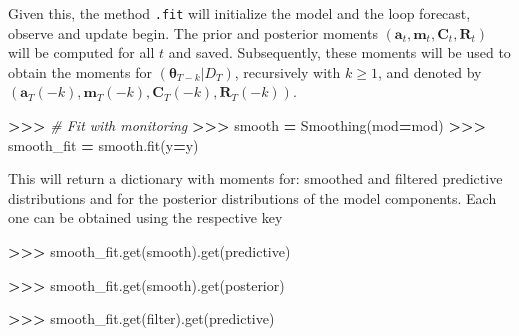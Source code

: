 \documentclass[
]{article}
\newenvironment{Shaded}{\begin{snugshade}}{\end{snugshade}}
\newcommand{\CommentTok}[1]{\textcolor[rgb]{0.56,0.35,0.01}{\textit{#1}}}
\newcommand{\NormalTok}[1]{#1}
\newcommand{\OperatorTok}[1]{\textcolor[rgb]{0.81,0.36,0.00}{\textbf{#1}}}
\newcommand{\StringTok}[1]{\textcolor[rgb]{0.31,0.60,0.02}{#1}}
\begin{document}
Given this, the method \texttt{.fit} will initialize the model and the
loop forecast, observe and update begin. The prior and posterior moments
\((\mathbf{a}_t, \mathbf{m}_t, \mathbf{C}_t, \mathbf{R}_t)\) will be
computed for all \(t\) and saved. Subsequently, these moments will be
used to obtain the moments for
\((\boldsymbol{\theta}_{T-k} \vert D_T)\), recursively with
\(k \geq 1\), and denoted by
\((\mathbf{a}_T(-k), \mathbf{m}_T(-k), \mathbf{C}_T(-k), \mathbf{R}_T(-k))\).

\begin{Shaded}
\begin{Highlighting}[]
\OperatorTok{\textgreater{}\textgreater{}\textgreater{}} \CommentTok{\# Fit with monitoring}
\OperatorTok{\textgreater{}\textgreater{}\textgreater{}}\NormalTok{ smooth }\OperatorTok{=}\NormalTok{ Smoothing(mod}\OperatorTok{=}\NormalTok{mod)}
\OperatorTok{\textgreater{}\textgreater{}\textgreater{}}\NormalTok{ smooth\_fit }\OperatorTok{=}\NormalTok{ smooth.fit(y}\OperatorTok{=}\NormalTok{y)}
\end{Highlighting}
\end{Shaded}

This will return a dictionary with moments for: smoothed and filtered
predictive distributions and for the posterior distributions of the
model components. Each one can be obtained using the respective key

\begin{Shaded}
\begin{Highlighting}[]
\OperatorTok{\textgreater{}\textgreater{}\textgreater{}}\NormalTok{ smooth\_fit.get(}\StringTok{\textquotesingle{}smooth\textquotesingle{}}\NormalTok{).get(}\StringTok{\textquotesingle{}predictive\textquotesingle{}}\NormalTok{)}
\end{Highlighting}
\end{Shaded}

\begin{Shaded}
\begin{Highlighting}[]
\OperatorTok{\textgreater{}\textgreater{}\textgreater{}}\NormalTok{ smooth\_fit.get(}\StringTok{\textquotesingle{}smooth\textquotesingle{}}\NormalTok{).get(}\StringTok{\textquotesingle{}posterior\textquotesingle{}}\NormalTok{)}
\end{Highlighting}
\end{Shaded}

\begin{Shaded}
\begin{Highlighting}[]
\OperatorTok{\textgreater{}\textgreater{}\textgreater{}}\NormalTok{ smooth\_fit.get(}\StringTok{\textquotesingle{}filter\textquotesingle{}}\NormalTok{).get(}\StringTok{\textquotesingle{}predictive\textquotesingle{}}\NormalTok{)}
\end{Highlighting}
\end{Shaded}
\end{document}
